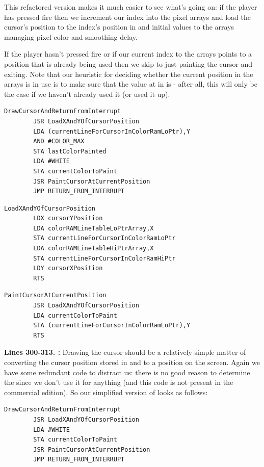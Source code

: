 This refactored version makes it much easier to see what's going on: if the player has pressed fire then we increment
our index into the pixel arrays and load the cursor's position to the index's position in 
and initial values to the arrays managing pixel color and smoothing delay.

If the player hasn't pressed fire or if our current index to the arrays points to a position that is already being used then
we skip to just painting the cursor and exiting. Note that our heuristic for deciding whether the current position in the 
arrays is in use is to make sure that the value at  in  is  - 
after all, this will only be the case if we haven't already used it (or used it up).

\clearpage
\begin{lstlisting}[caption = Paint the cursor and call the system default interrupt handler \icode{RETURN\_FROM\_INTERRUPT}]
DrawCursorAndReturnFromInterrupt   
        JSR LoadXAndYOfCursorPosition
        LDA (currentLineForCursorInColorRamLoPtr),Y
        AND #COLOR_MAX
        STA lastColorPainted
        LDA #WHITE
        STA currentColorToPaint
        JSR PaintCursorAtCurrentPosition
        JMP RETURN_FROM_INTERRUPT

\end{lstlisting}

\bigskip
\begin{lstlisting}[caption= Load the X and Y position and set up \icode{currentLineForCursorInColorRamLoPtr/currentLineForCursorInColorRamHiPtr}
for painting the cursor.]
LoadXAndYOfCursorPosition   
        LDX cursorYPosition
        LDA colorRAMLineTableLoPtrArray,X
        STA currentLineForCursorInColorRamLoPtr
        LDA colorRAMLineTableHiPtrArray,X
        STA currentLineForCursorInColorRamHiPtr
        LDY cursorXPosition
        RTS 
\end{lstlisting}
\bigskip
\begin{lstlisting}[caption = Paint the cursor.]
PaintCursorAtCurrentPosition   
        JSR LoadXAndYOfCursorPosition
        LDA currentColorToPaint
        STA (currentLineForCursorInColorRamLoPtr),Y
        RTS 
\end{lstlisting}
\clearpage

\textbf{Lines 300-313. :} Drawing the cursor should be a relatively simple matter
of converting the cursor position stored in  and  to a position on the screen. Again
we have some redundant code to distract us: there is no good reason to determine the  since we don't use it
for anything (and this code is not present in the commercial edition). So our simplified version of 
looks as follows:
\begin{lstlisting}
DrawCursorAndReturnFromInterrupt   
        JSR LoadXAndYOfCursorPosition
        LDA #WHITE
        STA currentColorToPaint
        JSR PaintCursorAtCurrentPosition
        JMP RETURN_FROM_INTERRUPT
\end{lstlisting}

